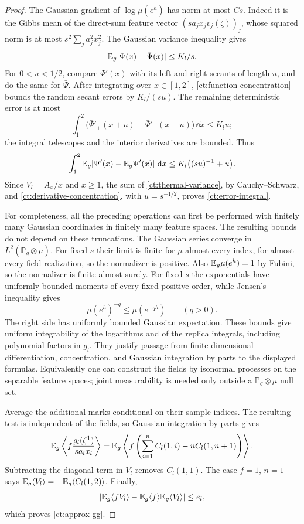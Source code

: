 \begin{proof}
The Gaussian gradient of $\log\mu(e^h)$ has norm at most $Cs$.
Indeed it is the Gibbs mean of the direct-sum feature vector
$(s a_jx_j v_j(\zeta))_j$, whose squared norm is at most
$s^2\sum_j a_j^2x_j^2$.  The Gaussian variance inequality gives
\begin{equation}\label{ct:function-concentration}
                  \mathbb E_g|\Psi(x)-\bar\Psi(x)|\le K_l/s.
\end{equation}
For $0<u<1/2$, compare $\Psi'(x)$ with its left and right secants of
length $u$, and do the same for $\bar\Psi$.  After integrating over
$x\in[1,2]$, \eqref{ct:function-concentration} bounds the random
secant errors by $K_l/(su)$.  The remaining deterministic error is at
most
\[
 \int_1^2\bigl(\bar\Psi'_+(x+u)-\bar\Psi'_-(x-u)\bigr)\,\dd x
 \le K_lu;
\]
the integral telescopes and the interior derivatives are bounded.
Thus
\begin{equation}\label{ct:derivative-concentration}
 \int_1^2\mathbb E_g|\Psi'(x)-\mathbb E_g\Psi'(x)|\,\,\mathrm d x
                         \le K_l\bigl((su)^{-1}+u\bigr).
\end{equation}
Since $V_l=A_x/x$ and $x\ge1$, the sum of
\eqref{ct:thermal-variance}, by Cauchy--Schwarz, and
\eqref{ct:derivative-concentration}, with $u=s^{-1/2}$, proves
\eqref{ct:error-integral}.

For completeness, all the preceding operations can first be performed
with finitely many Gaussian coordinates in finitely many feature spaces.
The resulting bounds do not depend on these truncations.  The Gaussian
series converge in $L^2(\mathbb P_g\otimes\mu)$.  For fixed $s$ their
limit is finite for $\mu$-almost every index, for almost every field
realization, so the normalizer is positive.  Also
$\mathbb E_g\mu(e^h)=1$ by Fubini, so the normalizer is finite almost surely.
For fixed $s$ the
exponentials have uniformly bounded moments of every fixed positive
order, while Jensen's inequality gives
\[
      \mu(e^h)^{-q}\le\mu(e^{-qh})\qquad(q>0).
\]
The right side has uniformly bounded Gaussian expectation.  These
bounds give uniform integrability of the logarithms and of the replica
integrals, including polynomial factors in $g_l$.  They justify passage
from finite-dimensional differentiation, concentration, and Gaussian
integration by parts to the displayed formulas.  Equivalently one can
construct the fields by isonormal processes on the separable feature
spaces; joint measurability is needed only outside a
$\mathbb P_g\otimes\mu$ null set.

Average the additional marks conditional on their sample indices.  The
resulting test is independent of the fields, so Gaussian integration by
parts gives
\[
 \mathbb E_g\left\langle f\frac{g_l(\zeta^1)}{s a_lx_l}\right\rangle
  =\mathbb E_g\left\langle
       f\left(\sum_{i=1}^n C_l(1,i)-nC_l(1,n+1)\right)
    \right\rangle.
\]
Subtracting the diagonal term in $V_l$ removes $C_l(1,1)$.
The case $f=1$, $n=1$ says
$\mathbb E_g\langle V_l\rangle=-\mathbb E_g\langle C_l(1,2)\rangle$.
Finally,
\[
 \left|\mathbb E_g\langle fV_l\rangle
       -\mathbb E_g\langle f\rangle\mathbb E_g\langle V_l\rangle\right|
 \le e_l,
\]
which proves \eqref{ct:approx-gg}.
\end{proof}

